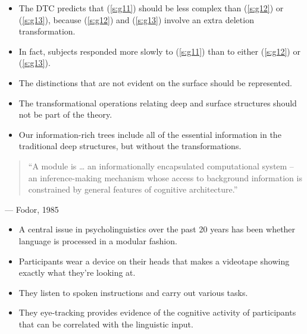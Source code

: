 \documentclass[a4paper,landscape,headrule,footrule]{foils}
\begin{document}
\begin{exe}
  \ex \label{s:g11} 
  \ex \label{s:g12} 
  \ex \label{s:g13} 
\end{exe}
\begin{itemize}
\item The DTC predicts that (\ref{s:g11}) should be less complex than
  (\ref{s:g12}) or (\ref{s:g13}), because (\ref{s:g12}) and
  (\ref{s:g13}) involve an extra deletion transformation.
\item In fact, subjects responded more slowly to (\ref{s:g11}) than to 
either (\ref{s:g12}) or (\ref{s:g13}).
\end{itemize}


\begin{itemize}
\item The  distinctions that are not evident 
on the surface should be represented.
\item The transformational operations relating deep and 
surface structures should not be part of the theory.
\item Our information-rich trees include all of the essential 
information in the traditional deep structures, but 
without the transformations.
\end{itemize}


\begin{quote}
  “A module is \ldots{} an informationally encapsulated computational system --
  an inference-making mechanism whose access to background information
  is constrained by general features of cognitive architecture.”
\end{quote}
\mbox{} \hfill --- Fodor, 1985  

\begin{itemize}
\item A central issue in psycholinguistics over the past 20 years has
  been whether language is processed in a modular fashion.
\end{itemize}



\begin{itemize}
\item Participants wear a device on their heads that makes 
a videotape showing exactly what they’re looking at.
\item They listen to spoken instructions and carry out 
various tasks. 
\item They eye-tracking provides evidence of the 
cognitive activity of participants that can be 
correlated with the linguistic input. 
\end{itemize}
\end{document}
